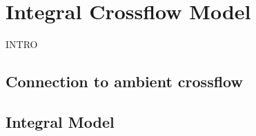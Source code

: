 \chapter{Integral Crossflow Model}
\label{CH:model}
INTRO


\section{Connection to ambient crossflow}



\section{Integral Model}
